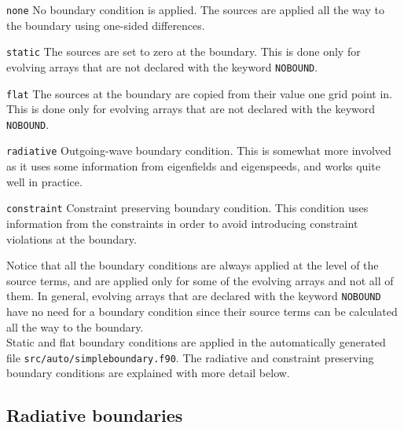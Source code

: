 \documentclass[12pt]{article}
\begin{document}
\begin{list}{}{
\setlength{\leftmargin}{35mm}
\setlength{\labelsep}{10mm}
\setlength{\labelwidth}{25mm}}

\item[\texttt{none}] No boundary condition is applied.  The sources are
  applied all the way to the boundary using one-sided differences.

\item[\texttt{static}] The sources are set to zero at the boundary.
  This is done only for evolving arrays that are not declared with the
  keyword \texttt{NOBOUND}.

\item[\texttt{flat}] The sources at the boundary are copied from their
  value one grid point in. This is done only for evolving arrays that
  are not declared with the keyword \texttt{NOBOUND}.

\item[\texttt{radiative}] Outgoing-wave boundary condition. This is
  somewhat more involved as it uses some information from eigenfields
  and eigenspeeds, and works quite well in practice.

\item[\texttt{constraint}] Constraint preserving boundary condition.
This condition uses information from the constraints in order to avoid
introducing constraint violations at the boundary.

\end{list}

\vspace{3mm}

Notice that all the boundary conditions are always applied at the
level of the source terms, and are applied only for some of the
evolving arrays and not all of them.  In general, evolving arrays that
are declared with the keyword \texttt{NOBOUND} have no need for a
boundary condition since their source terms can be calculated all the
way to the boundary. \\

Static and flat boundary conditions are applied in the automatically
generated file \linebreak \texttt{src/auto/simpleboundary.f90}.  The
radiative and constraint preserving boundary conditions are explained
with more detail below.


\subsection{Radiative boundaries}
\end{document}

